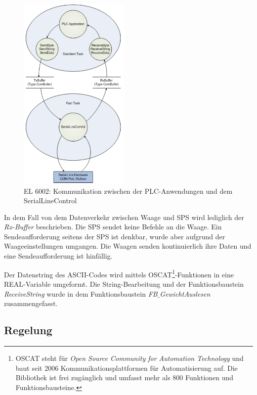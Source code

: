 \begin{figure}[htb]
\centering		\includegraphics[width=0.48\textwidth]{Pictures/RS232_Verarbeitung.png}
\caption{EL 6002: Kommunikation zwischen der PLC-Anwendungen und dem SerialLineControl \citep{Beckhoff2016-2}}
\label{fig:Combuffer}
\end{figure}

In dem Fall von dem Datenverkehr zwischen Waage und SPS wird lediglich der \textit{Rx-Buffer} beschrieben. Die SPS sendet keine Befehle an die Waage. Ein Sendeaufforderung seitens der SPS ist denkbar, wurde aber aufgrund der Waageeinstellungen umgangen. Die Waagen senden kontinuierlich ihre Daten und eine Sendeaufforderung ist hinfällig. 

Der Datenstring des ASCII-Codes wird mittels OSCAT\footnote{OSCAT steht für \textit{Open Source Community for Automation Technology} und baut seit 2006  Kommunikationsplattformen für Automatisierung auf. Die Bibliothek ist frei zugänglich und umfasst mehr als 800 Funktionen und Funktionsbausteine.}-Funktionen in eine REAL-Variable umgeformt. Die String-Bearbeitung und der Funktionsbaustein \textit{ReceiveString} wurde in dem Funktionsbaustein \textit{FB$\_$GewichtAuslesen} zusammengefasst.\citep{OSCAT2016}

\subsection{Regelung}
\label{subsec:Regelung}


